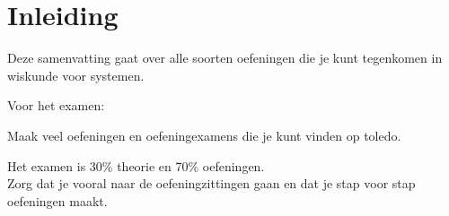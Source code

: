 \chapter{Inleiding}
\label{ch:inleiding}

Deze samenvatting gaat over alle soorten oefeningen die je kunt tegenkomen 
in wiskunde voor systemen.

Voor het examen:

\begin{examenbox}
Maak veel oefeningen en oefeningexamens die je kunt vinden op toledo. 

Het examen is 30\% theorie en 70\% oefeningen.\\

Zorg dat je vooral naar de oefeningzittingen gaan en dat je stap voor stap 
oefeningen maakt. 


\end{examenbox}